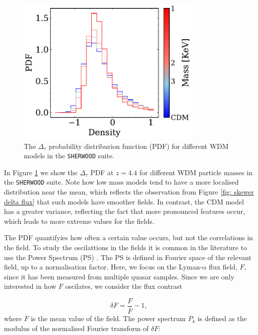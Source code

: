 \begin{figure}[h]
        \centering
            \includegraphics[width=0.8\textwidth]{img/ML/pdf_density_sherwood.pdf}
            \caption{The $\Delta_\tau$ probability distriburion function (PDF) for different WDM models in the \texttt{SHERWOOD} suite.}
            \label{fig: exact density PDF}
\end{figure}


In Figure \ref{fig: exact density PDF} we show the $\Delta_\tau$ PDF at $z=4.4$ for different WDM particle masses in the \texttt{SHERWOOD} suite. Note how low mass models tend to have a more localised distribution near the mean, which reflects the observation from Figure \ref{fig: skewer delta flux} that such models have smoother fields. In contrast, the CDM model has a greater variance, reflecting the fact that more pronounced features occur, which leads to more extreme values for the fields. 

The PDF quantifyies how often a certain value occurs, but not the correlations in the field. To study the oscilattions in the fields it is common in the literature to use the Power Spectrum (PS) \cite{McDonald_2006,Ravoux_2023}. The PS is defined in Fourier space of the relevant field, up to a normalisation factor. Here, we focus on the Lyman-$\alpha$ flux field, $F$, since it has been measured from multiple quasar samples. Since we are only interested in how $F$ oscilates, we consider the flux contrast

\begin{equation}\label{eq: flux contrast}
        \delta F=\frac{F}{\overline{F}} -1,
\end{equation}
where $\overline{F}$ is the mean value of the field. The power spectrum $P_k$ is defined as the modulus of the normalised Fourier transform of $\delta F$:

